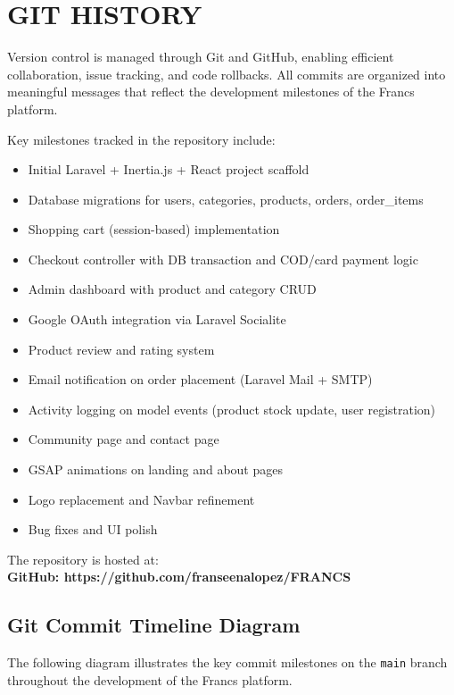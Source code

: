 \chapter{GIT HISTORY}
Version control is managed through Git and GitHub, enabling efficient collaboration, issue tracking, and code rollbacks. All commits are organized into meaningful messages that reflect the development milestones of the Francs platform.

\noindent Key milestones tracked in the repository include:
\begin{itemize}
    \item Initial Laravel + Inertia.js + React project scaffold
    \item Database migrations for users, categories, products, orders, order\_items
    \item Shopping cart (session-based) implementation
    \item Checkout controller with DB transaction and COD/card payment logic
    \item Admin dashboard with product and category CRUD
    \item Google OAuth integration via Laravel Socialite
    \item Product review and rating system
    \item Email notification on order placement (Laravel Mail + SMTP)
    \item Activity logging on model events (product stock update, user registration)
    \item Community page and contact page
    \item GSAP animations on landing and about pages
    \item Logo replacement and Navbar refinement
    \item Bug fixes and UI polish
\end{itemize}

\noindent The repository is hosted at:\\
\textbf{GitHub: https://github.com/franseenalopez/FRANCS}

\section{Git Commit Timeline Diagram}
The following diagram illustrates the key commit milestones on the \texttt{main} branch throughout the development of the Francs platform.

